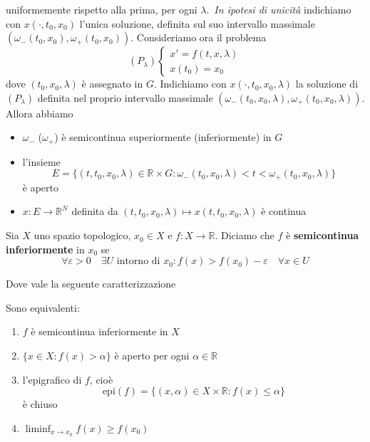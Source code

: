     uniformemente rispetto alla prima, per ogni \(\lambda\).~\emph{In ipotesi di
unicità} indichiamo con \(x(\cdot ,t_{0}, x_{0})\) l'unica soluzione, definita
sul suo intervallo massimale \({(\omega_-{(t_{0},x_{0})},
\omega_+{(t_{0},x_{0})})}\). Consideriamo ora il problema
\[
    (P_\lambda) \begin{cases}
        x' = f(t, x, \lambda) \\
        x(t_{0}) = x_{0}
    \end{cases}
\]
    dove \({(t_{0},x_{0},\lambda)}\) è assegnato in \(G\). Indichiamo con
    \(x{(\cdot ,t_{0},x_{0},\lambda)}\) la soluzione di \((P_\lambda)\) definita
    nel proprio intervallo massimale \({(\omega_-{(t_{0},x_{0},\lambda)},
    \omega_+{(t_{0},x_{0},\lambda)})}\). Allora abbiamo
\begin{theorem}
\begin{itemize}
    \item \(\omega_-\) (\(\omega_+\)) è semicontinua superiormente
        (inferiormente) in \(G\) 
    \item l'insieme 
        \[
            E = \{{(t,t_{0},x_{0},\lambda)} \in \mathbb{R}\times G :
            \omega_-{(t_{0},x_{0},\lambda)} < t < \omega_+{(t_{0},x_{0},\lambda)}\} 
        \]
        è aperto
    \item \(x : E \to \mathbb{R}^{N}\) definita da
        \({(t,t_{0},x_{0},\lambda)} \mapsto x{(t,t_{0},x_{0},\lambda)}\) è
        continua
\end{itemize}
\end{theorem}
\begin{definition}[Semicontinuità]
    Sia \(X\) uno spazio topologico, \(x_{0} \in X\) e \(f: X \to \mathbb{R}\).
    Diciamo che \(f\) è \textbf{semicontinua inferiormente} in \(x_{0}\) se
    \[
        \forall \varepsilon > 0 \quad \exists U \text{ intorno di } x_{0} :
        f(x) > f(x_{0}) - \varepsilon \quad \forall x \in U
    \]
\end{definition}
Dove vale la seguente caratterizzazione
\begin{proposition}
    Sono equivalenti: 
\begin{enumerate}[label = \roman*)]
    \item \(f\) è semicontinua inferiormente in \(X\)
    \item \(\{x \in X : f{(x)}>\alpha\} \) è aperto per ogni \(\alpha \in \mathbb{R}\) 
    \item l'epigrafico di \(f\), cioè 
        \[
            \text{epi}(f) = \{{(x, \alpha)} \in X \times \mathbb{R} : f(x) \le
            \alpha\} 
        \]
        è chiuso
    \item \(\liminf_{x \to x_{0}} f(x) \ge f(x_{0})\)
\end{enumerate}
\end{proposition}
